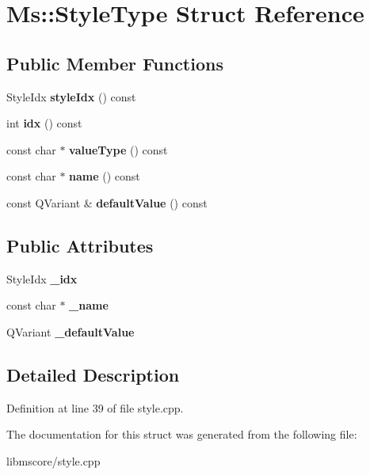 \hypertarget{struct_ms_1_1_style_type}{}\section{Ms\+:\+:Style\+Type Struct Reference}
\label{struct_ms_1_1_style_type}
\subsection*{Public Member Functions}
\begin{DoxyCompactItemize}
\item 
\mbox{\label{struct_ms_1_1_style_type_ac7de69d4775fec7f367ac660586fd00b}} 
Style\+Idx {\bfseries style\+Idx} () const
\item 
\mbox{\label{struct_ms_1_1_style_type_a58dc5849cb77b0d9fb887d7ecdccc6c4}} 
int {\bfseries idx} () const
\item 
\mbox{\label{struct_ms_1_1_style_type_a76dba69e99591f3e3153e9157c87c9cd}} 
const char $\ast$ {\bfseries value\+Type} () const
\item 
\mbox{\label{struct_ms_1_1_style_type_a1b3905b7ec4cf26ccd25d69079b41d20}} 
const char $\ast$ {\bfseries name} () const
\item 
\mbox{\label{struct_ms_1_1_style_type_a51e41adeb757fd25b268ee19fddb9bc2}} 
const Q\+Variant \& {\bfseries default\+Value} () const
\end{DoxyCompactItemize}
\subsection*{Public Attributes}
\begin{DoxyCompactItemize}
\item 
\mbox{\label{struct_ms_1_1_style_type_a25bbe9b2c28cdce5751b5fbe1748924f}} 
Style\+Idx {\bfseries \+\_\+idx}
\item 
\mbox{\label{struct_ms_1_1_style_type_aa4d86bfda3b359fea4680a85a71c1389}} 
const char $\ast$ {\bfseries \+\_\+name}
\item 
\mbox{\label{struct_ms_1_1_style_type_a691b2de92994d276dbb5ae82333a521b}} 
Q\+Variant {\bfseries \+\_\+default\+Value}
\end{DoxyCompactItemize}


\subsection{Detailed Description}


Definition at line 39 of file style.\+cpp.



The documentation for this struct was generated from the following file\+:\begin{DoxyCompactItemize}
\item 
libmscore/style.\+cpp\end{DoxyCompactItemize}
